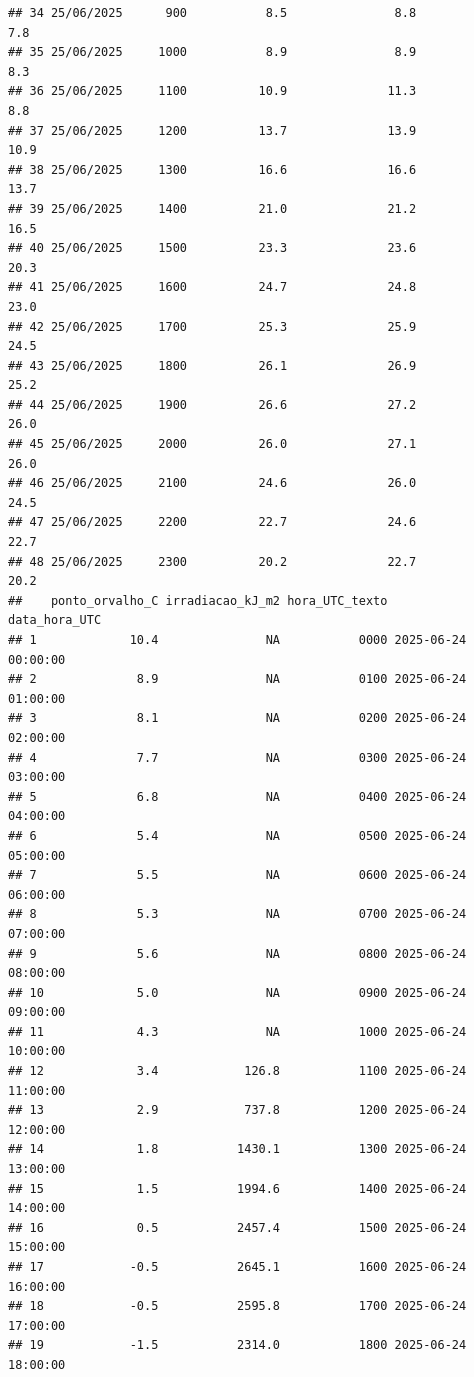 \documentclass[
]{article}
\begin{document}
\begin{verbatim}
## 34 25/06/2025      900           8.5               8.8               7.8
## 35 25/06/2025     1000           8.9               8.9               8.3
## 36 25/06/2025     1100          10.9              11.3               8.8
## 37 25/06/2025     1200          13.7              13.9              10.9
## 38 25/06/2025     1300          16.6              16.6              13.7
## 39 25/06/2025     1400          21.0              21.2              16.5
## 40 25/06/2025     1500          23.3              23.6              20.3
## 41 25/06/2025     1600          24.7              24.8              23.0
## 42 25/06/2025     1700          25.3              25.9              24.5
## 43 25/06/2025     1800          26.1              26.9              25.2
## 44 25/06/2025     1900          26.6              27.2              26.0
## 45 25/06/2025     2000          26.0              27.1              26.0
## 46 25/06/2025     2100          24.6              26.0              24.5
## 47 25/06/2025     2200          22.7              24.6              22.7
## 48 25/06/2025     2300          20.2              22.7              20.2
##    ponto_orvalho_C irradiacao_kJ_m2 hora_UTC_texto       data_hora_UTC
## 1             10.4               NA           0000 2025-06-24 00:00:00
## 2              8.9               NA           0100 2025-06-24 01:00:00
## 3              8.1               NA           0200 2025-06-24 02:00:00
## 4              7.7               NA           0300 2025-06-24 03:00:00
## 5              6.8               NA           0400 2025-06-24 04:00:00
## 6              5.4               NA           0500 2025-06-24 05:00:00
## 7              5.5               NA           0600 2025-06-24 06:00:00
## 8              5.3               NA           0700 2025-06-24 07:00:00
## 9              5.6               NA           0800 2025-06-24 08:00:00
## 10             5.0               NA           0900 2025-06-24 09:00:00
## 11             4.3               NA           1000 2025-06-24 10:00:00
## 12             3.4            126.8           1100 2025-06-24 11:00:00
## 13             2.9            737.8           1200 2025-06-24 12:00:00
## 14             1.8           1430.1           1300 2025-06-24 13:00:00
## 15             1.5           1994.6           1400 2025-06-24 14:00:00
## 16             0.5           2457.4           1500 2025-06-24 15:00:00
## 17            -0.5           2645.1           1600 2025-06-24 16:00:00
## 18            -0.5           2595.8           1700 2025-06-24 17:00:00
## 19            -1.5           2314.0           1800 2025-06-24 18:00:00

\end{verbatim}
\end{document}
